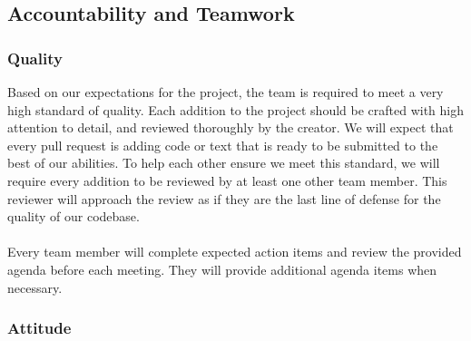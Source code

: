 \documentclass{article}
\begin{document}
\subsection*{Accountability and Teamwork}

\subsubsection*{Quality} 
Based on our expectations for the project, the team is required to meet a very high standard of quality.
Each addition to the project should be crafted with high attention to detail, and reviewed thoroughly by the creator.
We will expect that every pull request is adding code or text that is ready to be submitted to the best of our abilities.
To help each other ensure we meet this standard, we will require every addition to be reviewed by at least one other team member.
This reviewer will approach the review as if they are the last line of defense for the quality of our codebase.\\\\
Every team member will complete expected action items and review the provided agenda before each meeting. They will provide additional agenda items when necessary.

\subsubsection*{Attitude}
\end{document}
